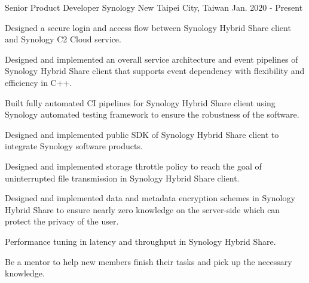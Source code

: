 

\begin{cventries}

  \cventry
    {Senior Product Developer} %
    {Synology} %
    {New Taipei City, Taiwan} %
    {Jan. 2020 - Present} %
    {
      \begin{cvitems} %
        \item {Designed a secure login and access flow between Synology Hybrid Share client and Synology C2 Cloud service.}
        \item {Designed and implemented an overall service architecture and event pipelines of Synology Hybrid Share client that supports event dependency with flexibility and efficiency in C++.}
        \item {Built fully automated CI pipelines for Synology Hybrid Share client using Synology automated testing framework to ensure the robustness of the software.}
        \item {Designed and implemented public SDK of Synology Hybrid Share client to integrate Synology software products.}
        \item {Designed and implemented storage throttle policy to reach the goal of uninterrupted file transmission in Synology Hybrid Share client.}
        \item {Designed and implemented data and metadata encryption schemes in Synology Hybrid Share to ensure nearly zero knowledge on the server-side which can protect the privacy of the user.}
        \item {Performance tuning in latency and throughput in Synology Hybrid Share.}
        \item {Be a mentor to help new members finish their tasks and pick up the necessary knowledge.}
      \end{cvitems}
    }


\end{cventries}
